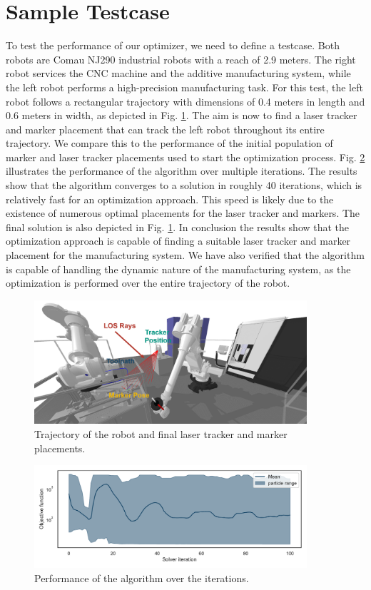 \documentclass{svproc}
\begin{document}
\section{Sample Testcase}
To test the performance of our optimizer, we need to define a testcase.
Both robots are Comau NJ290 industrial robots with a reach of 2.9 meters.
The right robot services the CNC machine and the additive manufacturing system, while the left robot performs a high-precision manufacturing task.
For this test, the left robot follows a rectangular trajectory with dimensions of 0.4 meters in length and 0.6 meters in width, as depicted in Fig. \ref{fig:trajectory}.
The aim is now to find a laser tracker and marker placement that can track the left robot throughout its entire trajectory.
We compare this to the performance of the initial population of marker and laser tracker placements used to start the optimization process.
Fig. \ref{fig:iterations} illustrates the performance of the algorithm over multiple iterations.
The results show that the algorithm converges to a solution in roughly 40 iterations, which is relatively fast for an optimization approach.
This speed is likely due to the existence of numerous optimal placements for the laser tracker and markers.
The final solution is also depicted in Fig. \ref{fig:trajectory}.
In conclusion the results show that the optimization approach is capable of finding a suitable laser tracker and marker placement for the manufacturing system.
We have also verified that the algorithm is capable of handling the dynamic nature of the manufacturing system, as the optimization is performed over the entire trajectory of the robot.
\begin{figure}
    \centering
    \includegraphics[width=0.9\textwidth]{figures/trajectory.png}
    \caption{Trajectory of the robot and final laser tracker and marker placements.}
    \label{fig:trajectory}
\end{figure}
\begin{figure}
    \centering
    \includegraphics[width=0.9\textwidth]{figures/iterations.pdf}
    \caption{Performance of the algorithm over the iterations.}
    \label{fig:iterations}
\end{figure}
\end{document}
